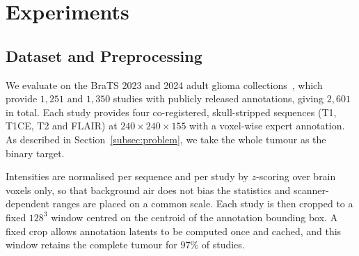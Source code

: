 %
%
%
%

\section{Experiments}
\label{sec:experiments}

\subsection{Dataset and Preprocessing}
\label{subsec:dataset}

We evaluate on the BraTS 2023 and 2024 adult glioma
collections~\cite{brats_menze,brats_bakas,brats2021}, which provide
$1{,}251$ and $1{,}350$ studies with publicly released annotations, giving
$2{,}601$ in total. Each study provides four co-registered, skull-stripped
sequences (T1, T1CE, T2 and FLAIR) at
$240 \times 240 \times 155$ with a voxel-wise expert annotation. As described
in Section~\ref{subsec:problem}, we take the whole tumour as the binary
target.

Intensities are normalised per sequence and per study by $z$-scoring over
brain voxels only, so that background air does not bias the statistics and
scanner-dependent ranges are placed on a common scale. Each study is then
cropped to a fixed $128^{3}$ window centred on the centroid of the annotation
bounding box. A fixed crop allows annotation latents to be computed once and
cached, and this window retains the complete tumour for $97\%$ of studies.

